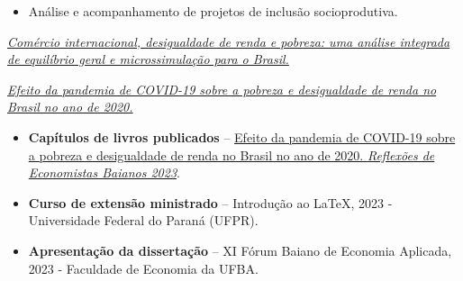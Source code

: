 \documentclass[10pt,a4paper]{cv}
\begin{document}
\begin{itemize}
\item Análise e acompanhamento de projetos de inclusão socioprodutiva.
\end{itemize}





  \faBook \hspace{0.1cm} \href{https://acervodigital.ufpr.br/xmlui/handle/1884/88173}{\small \textit{Comércio internacional, desigualdade de renda e pobreza: uma análise integrada de equilíbrio geral e microssimulação para o Brasil.}}

\divider


  \faBook \hspace{0.1cm} \href{https://repositorio.ufba.br/handle/ri/34872}{\textit{\small Efeito da pandemia de COVID-19 sobre a pobreza e desigualdade de renda no Brasil no ano de 2020.}}

\divider





\begin{itemize}
  \item \textbf{Capítulos de livros publicados} -- \href{http://www.corecon-ba.org.br/wp-content/uploads/2023/08/Reflex%C3%B5es-Economistas-Baianos-2023_FINAL_07.08.2023_vhp-compactado-compactado.pdf}{Efeito da pandemia de COVID-19 sobre a pobreza e desigualdade de renda no Brasil no ano de 2020. \textit{Reflexões de Economistas Baianos 2023}}.

  \item \textbf{Curso de extensão ministrado} -- Introdução ao \LaTeX{}, 2023 - Universidade Federal do Paraná (UFPR).

  \item \textbf{Apresentação da dissertação} -- XI Fórum Baiano de Economia Aplicada, 2023 - Faculdade de Economia da UFBA.
\end{itemize}
\end{document}
